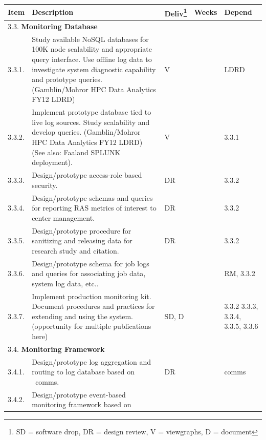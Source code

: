 \begin{longtable}{|p{1cm}|p{10.2cm}|p{1cm}|p{1cm}|p{1.8cm}|}\hline
  \textbf{Item} & \textbf{Description}
                & \textbf{Deliv}\footnote{SD = software drop,
                        DR = design review, V = viewgraphs, D = document}
                & \textbf{Weeks} & \textbf{Depend} \\
  \hline
  \hline
  \multicolumn{5}{|l|}{3.3. \textbf{Monitoring Database}} \\
  \hline
  3.3.1.& Study available NoSQL databases for 100K node scalability
          and appropriate query interface.
          Use offline log data to investigate system diagnostic capability
          and prototype queries.
          (Gamblin/Mohror HPC Data Analytics FY12 LDRD)
        & V
        & 
        & LDRD \\
  \hline
  3.3.2.& Implement prototype database tied to live log sources.
          Study scalability and develop queries.
          (Gamblin/Mohror HPC Data Analytics FY12 LDRD)
          (See also: Faaland SPLUNK deployment).
        & V
        & 
        & 3.3.1 \\
  \hline
  3.3.3.& Design/prototype access-role based security.
        & DR
        & 
        & 3.3.2 \\
  \hline
  3.3.4.& Design/prototype schemas and queries for reporting
          RAS metrics of interest to center management.
        & DR
        & 
        & 3.3.2 \\
  \hline
  3.3.5.& Design/prototype procedure for sanitizing and releasing data
	  for research study and citation.
        & DR
        & 
        & 3.3.2 \\
  \hline
  3.3.6.& Design/prototype schema for job logs and queries for
          associating job data, system log data, etc..
        & 
        & 
        & RM, 3.3.2 \\
  \hline
  3.3.7.& Implement production monitoring kit.
          Document procedures and practices for extending and using the system.
          (opportunity for multiple publications here) 
        & SD, D
        & 
        & 3.3.2 3.3.3, 3.3.4, 3.3.5, 3.3.6 \\
  \hline
  \multicolumn{5}{|l|}{3.4. \textbf{Monitoring Framework}} \\
  \hline
  3.4.1.& Design/prototype log aggregation and routing to log database
	  based on \ngrm\ comms.
        & DR
        &
        & comms \\
  \hline
  3.4.2.& Design/prototype event-based monitoring framework based on

\end{longtable}
